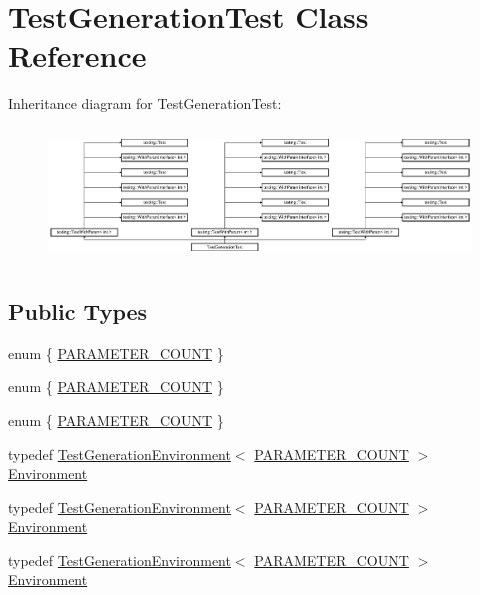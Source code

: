 \hypertarget{class_test_generation_test}{}\section{Test\+Generation\+Test Class Reference}
\label{class_test_generation_test}
Inheritance diagram for Test\+Generation\+Test\+:\begin{figure}[H]
\begin{center}
\leavevmode
\includegraphics[height=3.572568cm]{dd/d9e/class_test_generation_test}
\end{center}
\end{figure}
\subsection*{Public Types}
\begin{DoxyCompactItemize}
\item 
enum \{ \mbox{\hyperlink{class_test_generation_test_a2428a54a0382f6da86eda1bbe01144d5a6c6e91a1d2c5dc9dc65fa575d368be76}{P\+A\+R\+A\+M\+E\+T\+E\+R\+\_\+\+C\+O\+U\+NT}}
 \}
\item 
enum \{ \mbox{\hyperlink{class_test_generation_test_a2428a54a0382f6da86eda1bbe01144d5a6c6e91a1d2c5dc9dc65fa575d368be76}{P\+A\+R\+A\+M\+E\+T\+E\+R\+\_\+\+C\+O\+U\+NT}}
 \}
\item 
enum \{ \mbox{\hyperlink{class_test_generation_test_a2428a54a0382f6da86eda1bbe01144d5a6c6e91a1d2c5dc9dc65fa575d368be76}{P\+A\+R\+A\+M\+E\+T\+E\+R\+\_\+\+C\+O\+U\+NT}}
 \}
\item 
typedef \mbox{\hyperlink{class_test_generation_environment}{Test\+Generation\+Environment}}$<$ \mbox{\hyperlink{class_test_generation_test_a2428a54a0382f6da86eda1bbe01144d5a6c6e91a1d2c5dc9dc65fa575d368be76}{P\+A\+R\+A\+M\+E\+T\+E\+R\+\_\+\+C\+O\+U\+NT}} $>$ \mbox{\hyperlink{class_test_generation_test_aeff004d79bbb376d7acecd28f9fb71c6}{Environment}}
\item 
typedef \mbox{\hyperlink{class_test_generation_environment}{Test\+Generation\+Environment}}$<$ \mbox{\hyperlink{class_test_generation_test_a2428a54a0382f6da86eda1bbe01144d5a6c6e91a1d2c5dc9dc65fa575d368be76}{P\+A\+R\+A\+M\+E\+T\+E\+R\+\_\+\+C\+O\+U\+NT}} $>$ \mbox{\hyperlink{class_test_generation_test_aeff004d79bbb376d7acecd28f9fb71c6}{Environment}}
\item 
typedef \mbox{\hyperlink{class_test_generation_environment}{Test\+Generation\+Environment}}$<$ \mbox{\hyperlink{class_test_generation_test_a2428a54a0382f6da86eda1bbe01144d5a6c6e91a1d2c5dc9dc65fa575d368be76}{P\+A\+R\+A\+M\+E\+T\+E\+R\+\_\+\+C\+O\+U\+NT}} $>$ \mbox{\hyperlink{class_test_generation_test_aeff004d79bbb376d7acecd28f9fb71c6}{Environment}}
\end{DoxyCompactItemize}
